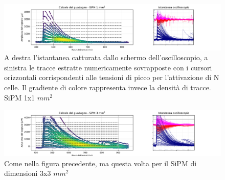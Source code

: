\documentclass[journal]{IEEEtran}
\begin{document}
\begin{figure}[t]%
\centering
\begin{center}
\includegraphics[trim = {100pt 0 0 0}, width=1.15\textwidth]{analysis/output/SiPM_1mm_gain_staircase.pdf}
\end{center}
\caption{A destra l'istantanea catturata dallo schermo dell'oscilloscopio, a sinistra le tracce estratte numericamente sovrapposte con i cursori orizzontali corrispondenti alle tensioni di picco per l'attivazione di N celle. Il gradiente di colore rappresenta invece la densità di tracce. SiPM 1x1 $mm^2$}
\label{fig:staircase_1mm}
\end{figure}

\begin{figure}[t]%
\centering
\begin{center}
\includegraphics[trim = {100pt 0 0 0}, width=1.15\textwidth]{analysis/output/SiPM_3mm_gain_staircase.pdf}
\end{center}
\caption{Come nella figura precedente, ma questa volta per il SiPM di dimensioni 3x3 $mm^2$}
\label{fig:staircase_3mm}
\end{figure}
\end{document}
